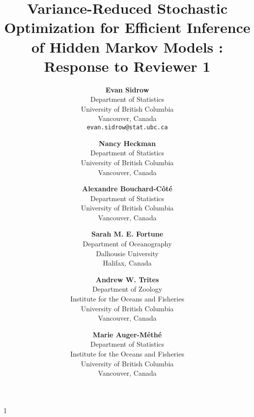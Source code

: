 \documentclass[11pt]{article}
\date{}
\newcommand{\blind}{1}
\begin{document}
%

\def\spacingset#1{\renewcommand{\baselinestretch}%
{#1}\small\normalsize} \spacingset{1}


\blind
{
    \title{Variance-Reduced Stochastic Optimization for Efficient Inference of Hidden Markov Models : Response to Reviewer 1}

    \author{
      \textbf{Evan Sidrow} \\
      Department of Statistics \\
      University of British Columbia\\
      Vancouver, Canada \\
      \texttt{evan.sidrow@stat.ubc.ca} \\
      \and
      \textbf{Nancy Heckman} \\
      Department of Statistics \\
      University of British Columbia \\
      Vancouver, Canada \\
      \and
      \textbf{Alexandre Bouchard-C\^ot\'e} \\
      Department of Statistics \\
      University of British Columbia \\
      Vancouver, Canada \\
      \and
      \textbf{Sarah M. E. Fortune} \\
      Department of Oceanography \\
      Dalhousie University \\
      Halifax, Canada \\
      \and
      \textbf{Andrew W. Trites} \\
      Department of Zoology \\
      Institute for the Oceans and Fisheries \\
      University of British Columbia \\
      Vancouver, Canada \\
      \and
      \textbf{Marie Auger-M\'eth\'e} \\
      Department of Statistics \\
      Institute for the Oceans and Fisheries \\
      University of British Columbia \\
      Vancouver, Canada \\
    }
    \maketitle
} \fi
\end{document}
